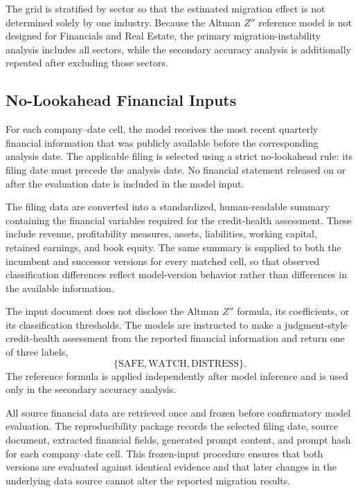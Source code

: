 \documentclass{ieeeaccess}
\begin{document}
The grid is stratified by sector so that the estimated migration effect is not determined solely by one industry. Because the Altman $Z''$ reference model is not designed for Financials and Real Estate, the primary migration-instability analysis includes all sectors, while the secondary accuracy analysis is additionally repeated after excluding those sectors.

\subsection{No-Lookahead Financial Inputs}
For each company--date cell, the model receives the most recent quarterly financial information that was publicly available before the corresponding analysis date. The applicable filing is selected using a strict no-lookahead rule: its filing date must precede the analysis date. No financial statement released on or after the evaluation date is included in the model input.

The filing data are converted into a standardized, human-readable summary containing the financial variables required for the credit-health assessment. These include revenue, profitability measures, assets, liabilities, working capital, retained earnings, and book equity. The same summary is supplied to both the incumbent and successor versions for every matched cell, so that observed classification differences reflect model-version behavior rather than differences in the available information.

The input document does not disclose the Altman $Z''$ formula, its coefficients, or its classification thresholds. The models are instructed to make a judgment-style credit-health assessment from the reported financial information and return one of three labels,
\begin{equation}
\{\text{SAFE},\text{WATCH},\text{DISTRESS}\}.
\end{equation}
The reference formula is applied independently after model inference and is used only in the secondary accuracy analysis.

All source financial data are retrieved once and frozen before confirmatory model evaluation. The reproducibility package records the selected filing date, source document, extracted financial fields, generated prompt content, and prompt hash for each company--date cell. This frozen-input procedure ensures that both versions are evaluated against identical evidence and that later changes in the underlying data source cannot alter the reported migration results.
\end{document}

